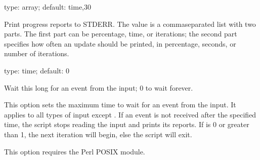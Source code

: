 \documentclass[letterpaper,10pt,english]{sphinxmanual}
\begin{document}

\begin{fulllineitems}
\label{\detokenize{mariadb-query-digest:cmdoption-mariadb-query-digest-progress}}
\sphinxAtStartPar
type: array; default: time,30

\sphinxAtStartPar
Print progress reports to STDERR.  The value is a comma\sphinxhyphen{}separated list with two
parts.  The first part can be percentage, time, or iterations; the second part
specifies how often an update should be printed, in percentage, seconds, or
number of iterations.

\end{fulllineitems}


\begin{fulllineitems}
\label{\detokenize{mariadb-query-digest:cmdoption-mariadb-query-digest-read-timeout}}
\sphinxAtStartPar
type: time; default: 0

\sphinxAtStartPar
Wait this long for an event from the input; 0 to wait forever.

\sphinxAtStartPar
This option sets the maximum time to wait for an event from the input.  It
applies to all types of input except {\hyperref[\detokenize{mariadb-query-digest:cmdoption-mariadb-query-digest-processlist}]{}}.  If an
event is not received after the specified time, the script stops reading the
input and prints its reports.  If {\hyperref[\detokenize{mariadb-query-digest:cmdoption-mariadb-query-digest-iterations}]{}} is 0 or greater than
1, the next iteration will begin, else the script will exit.

\sphinxAtStartPar
This option requires the Perl POSIX module.

\end{fulllineitems}
\end{document}

